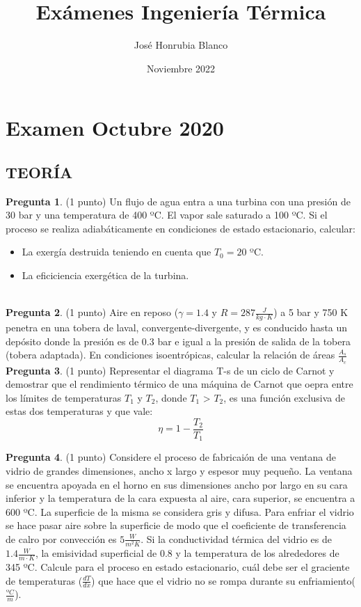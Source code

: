 \documentclass[12pt]{article}
\title{Exámenes Ingeniería Térmica}
\author{José Honrubia Blanco }
\date{Noviembre 2022}
\begin{document}
\section{Examen Octubre 2020}
\subsection{TEORÍA}
\textbf{Pregunta 1}. (1 punto) Un flujo de agua entra a una turbina con una presión de 30 bar y una temperatura de 400 ºC. El vapor sale saturado a 100 ºC. Si el proceso se realiza adiabáticamente en condiciones de estado estacionario, calcular:
\begin{itemize}
    \item La exergía destruida teniendo en cuenta que $T _{0}=20$ ºC.
    \item La eficiciencia exergética de la turbina.
\end{itemize}

\\ 
\textbf{Pregunta 2}. (1 punto) Aire en reposo ($\gamma = 1.4$ y $R = 287 \frac{J}{kg\cdot K}$) a 5 bar y 750 K penetra en una tobera de laval, convergente-divergente, y es conducido hasta un depósito donde la presión es de 0.3 bar e igual a la presión de salida de la tobera (tobera adaptada). En condiciones isoentrópicas, calcular la relación de áreas $\frac{A _{s}}{A _{c}}$
\\
\textbf{Pregunta 3}. (1 punto) Representar el diagrama T-s de un ciclo de Carnot y demostrar que el rendimiento térmico de una máquina de Carnot que oepra entre los límites de temperaturas $T _{1}$ y $T _{2}$, donde $T _{1}$ > $ T _{2}$, es una función exclusiva de estas dos temperaturas y que vale:
\begin{equation}
    \eta = 1 - \frac{T _{2}}{T _{1}}
  \label{eqn:}
\end{equation}

\textbf{Pregunta 4}. (1 punto) Considere el proceso de fabricaión de una ventana de vidrio de grandes dimensiones, ancho x largo y espesor muy pequeño. La ventana se encuentra apoyada en el horno en sus dimensiones ancho por largo en su cara inferior y la temperatura de la cara expuesta al aire, cara superior, se encuentra a 600 ºC. La superficie de la misma se considera gris y difusa. Para enfriar el vidrio se hace pasar aire sobre la superficie de modo que el coeficiente de transferencia de calro por convección es $5 \frac{W}{m ^{2}K}$. Si la conductividad térmica del vidrio es de $1.4 \frac{W}{m\cdot K}$, la emisividad superficial de 0.8 y la temperatura de los alrededores de 345 ºC. Calcule para el proceso en estado estacionario, cuál debe ser el graciente de temperaturas ($\frac{dT}{dx}$) que hace que el vidrio no se rompa durante su enfriamiento($\frac{ºC}{m}$). 
\\
\end{document}
